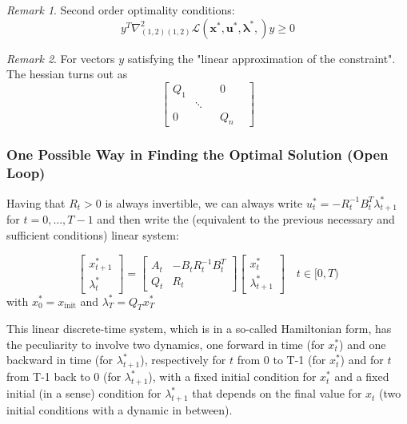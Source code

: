 \documentclass[openany]{book}
\theoremstyle{definition}
\theoremstyle{remark}
\newtheorem*{remark}{Remark}
\begin{document}
\begin{remark}
Second order optimality conditions:
\[
    y^T\nabla^2_{(1,2)(1,2)}\mathcal{L}(\mathbf{x}^*,\mathbf{u}^*,\boldsymbol{\lambda}^*,)y \geq 0
\]
\end{remark}
\begin{remark}
    For vectors $y$ satisfying the "linear approximation of the constraint". The hessian turns out as 
    \[
        \begin{bmatrix}
            Q_1 & & &  0\\
                & \ddots & & & \\ 
            0 & & & Q_n
        \end{bmatrix}
    \]    
\end{remark}

\subsubsection{One Possible Way in Finding the Optimal Solution (Open Loop)}

Having that $R_t > 0$ is always invertible, we can always write $u_t^* = -R_t^{-1}B_t^T\lambda_{t+1}^*$ for $t=0,...,T-1$ and then write the (equivalent to the previous necessary and sufficient conditions) linear system:

\[
    \begin{bmatrix}
        x_{t+1}^* \\ \lambda_t^*
    \end{bmatrix} = \begin{bmatrix}
        A_t & -B_tR_t^{-1}B_t^T \\ Q_t & R_t
    \end{bmatrix} \begin{bmatrix}
        x_t^* \\ \lambda_{t+1}^*
    \end{bmatrix} \quad t\in[0,T)
\]
with $x_0^* = x_{\text{init}}$ and $\lambda_T^* = Q_Tx_T^*$

This linear discrete-time system, which is in a so-called Hamiltonian form, has the peculiarity to involve two dynamics, one forward in time (for $x_t^*$) and one backward in time (for $\lambda_{t+1}^*$), respectively for $t$ from 0 to T-1 (for $x_t^*$) and for $t$ from T-1 back to 0 (for $\lambda_{t+1}^*$), with a fixed initial condition for $x_t^*$ and a fixed initial (in a sense) condition for $\lambda_{t+1}^*$ that depends on the final value for $x_t$ (two initial conditions with a dynamic in between).
\end{document}
